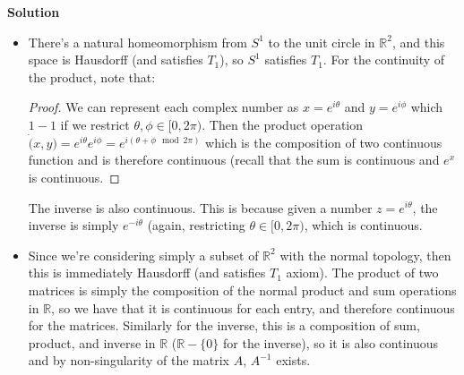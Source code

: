 \documentclass[12pt]{article}
\newcounter{AnswerCounter}
\newcounter{SubAnswerCounter}
\newenvironment{answer}[0]{
  \setcounter{SubAnswerCounter}{1}
  \bigskip
  \textbf{Solution \arabic{AnswerCounter}}
  \\
  \begin{small}
}{
  \end{small}
  \stepcounter{AnswerCounter}
}
\begin{document}
\begin{answer}[Page 145, \# 2]
\begin{itemize}
\begin{proof}
\begin{align*}
&= \frac{\epsilon}{3} < \epsilon
\end{align*}
\end{proof}
Similarly, the inverse of the produce (ie, $\frac{1}{x}$) is continuous for $x > 0$.
\begin{proof}
Consider the open interval $(a,b) \in \mathbb{R}^+$. Then the inverse image is simply given by $(\frac{1}{b}, \frac{1}{a})$ which is also open in $\mathbb{R}^+$, thereby showing continuity.
\end{proof}
\item There's a natural homeomorphism from $S^1$ to the unit circle in $\mathbb{R}^2$, and this space is Hausdorff (and satisfies $T_1$), so $S^{1}$ satisfies $T_1$. For the continuity of the product, note that:
\begin{proof}
We can represent each complex number as $x = e^{i\theta}$ and $y = e^{i\phi}$ which $1-1$ if we restrict $\theta,\phi \in [0,2\pi)$. Then the product operation $\dot(x,y) = e^{i\theta}e^{i\phi} = e^{i(\theta + \phi\mod 2\pi)}$ which is the composition of two continuous function and is therefore continuous (recall that the sum is continuous and $e^x$ is continuous.
\end{proof}
The inverse is also continuous. This is because given a number $z = e^{i\theta}$, the inverse is simply $e^{-i\theta}$ (again, restricting $\theta \in [0,2\pi)$, which is continuous.
\item Since we're considering simply a subset of $\mathbb{R}^2$ with the normal topology, then this is immediately Hausdorff (and satisfies $T_1$ axiom). The product of two matrices is simply the composition of the normal product and sum operations in $\mathbb{R}$, so we have that it is continuous for each entry, and therefore continuous for the matrices. Similarly for the inverse, this is a composition of sum, product, and inverse in $\mathbb{R}$ ($\mathbb{R} - \{0\}$ for the inverse), so it is also continuous and by non-singularity of the matrix $A$, $A^{-1}$ exists.
\end{itemize}
\end{answer}
\end{document}
